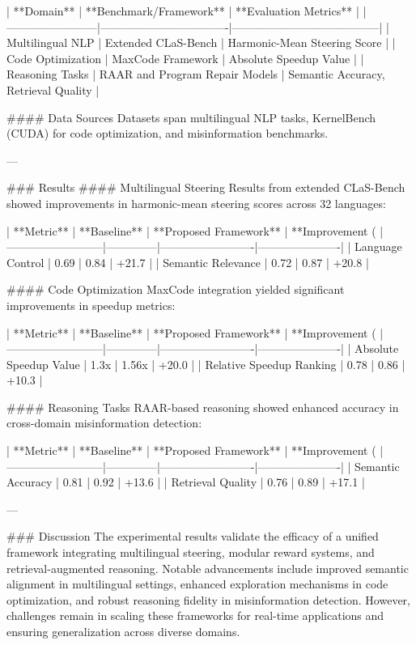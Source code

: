 | **Domain**            | **Benchmark/Framework**         | **Evaluation Metrics**                |  
|------------------------|----------------------------------|---------------------------------------|  
| Multilingual NLP       | Extended CLaS-Bench             | Harmonic-Mean Steering Score          |  
| Code Optimization      | MaxCode Framework               | Absolute Speedup Value                |  
| Reasoning Tasks        | RAAR and Program Repair Models  | Semantic Accuracy, Retrieval Quality  |  

#### Data Sources  
Datasets span multilingual NLP tasks, KernelBench (CUDA) for code optimization, and misinformation benchmarks.  

---

### Results  
#### Multilingual Steering  
Results from extended CLaS-Bench showed improvements in harmonic-mean steering scores across 32 languages:  

| **Metric**               | **Baseline** | **Proposed Framework** | **Improvement (%
|--------------------------|--------------|-------------------------|----------------------|  
| Language Control         | 0.69         | 0.84                    | +21.7               |  
| Semantic Relevance       | 0.72         | 0.87                    | +20.8               |  

#### Code Optimization  
MaxCode integration yielded significant improvements in speedup metrics:  

| **Metric**               | **Baseline** | **Proposed Framework** | **Improvement (%
|--------------------------|--------------|-------------------------|----------------------|  
| Absolute Speedup Value   | 1.3x         | 1.56x                   | +20.0               |  
| Relative Speedup Ranking | 0.78         | 0.86                    | +10.3               |  

#### Reasoning Tasks  
RAAR-based reasoning showed enhanced accuracy in cross-domain misinformation detection:  

| **Metric**               | **Baseline** | **Proposed Framework** | **Improvement (%
|--------------------------|--------------|-------------------------|----------------------|  
| Semantic Accuracy        | 0.81         | 0.92                    | +13.6               |  
| Retrieval Quality        | 0.76         | 0.89                    | +17.1               |  

---

### Discussion  
The experimental results validate the efficacy of a unified framework integrating multilingual steering, modular reward systems, and retrieval-augmented reasoning. Notable advancements include improved semantic alignment in multilingual settings, enhanced exploration mechanisms in code optimization, and robust reasoning fidelity in misinformation detection. However, challenges remain in scaling these frameworks for real-time applications and ensuring generalization across diverse domains.

